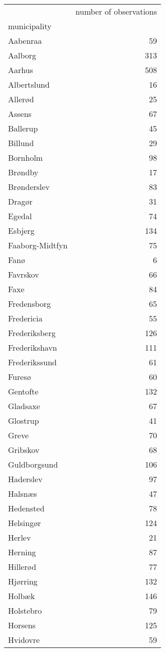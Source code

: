 \begin{tabular}{lr}
 & number of observations \\
municipality &  \\
Aabenraa & 59 \\
Aalborg & 313 \\
Aarhus & 508 \\
Albertslund & 16 \\
Allerød & 25 \\
Assens & 67 \\
Ballerup & 45 \\
Billund & 29 \\
Bornholm & 98 \\
Brøndby & 17 \\
Brønderslev & 83 \\
Dragør & 31 \\
Egedal & 74 \\
Esbjerg & 134 \\
Faaborg-Midtfyn & 75 \\
Fanø & 6 \\
Favrskov & 66 \\
Faxe & 84 \\
Fredensborg & 65 \\
Fredericia & 55 \\
Frederiksberg & 126 \\
Frederikshavn & 111 \\
Frederikssund & 61 \\
Furesø & 60 \\
Gentofte & 132 \\
Gladsaxe & 67 \\
Glostrup & 41 \\
Greve & 70 \\
Gribskov & 68 \\
Guldborgsund & 106 \\
Haderslev & 97 \\
Halsnæs & 47 \\
Hedensted & 78 \\
Helsingør & 124 \\
Herlev & 21 \\
Herning & 87 \\
Hillerød & 77 \\
Hjørring & 132 \\
Holbæk & 146 \\
Holstebro & 79 \\
Horsens & 125 \\
Hvidovre & 59 \\

\end{tabular}
